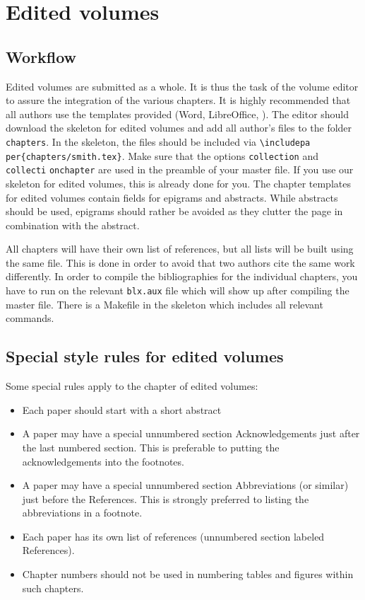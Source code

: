 \chapter{Edited volumes}
\section{Workflow}
Edited volumes are submitted as a whole. It is thus the task of the volume editor to assure the integration of the various chapters. It is highly recommended that all authors use the templates provided (Word, LibreOffice, \latex). The editor should download the skeleton for edited volumes and add all author's files to the folder \verb+chapters+. In the skeleton, the files should be included via \verb+\includepa+ \verb+per{chapters/smith.tex}+. Make sure that the options \verb+collection+ and \verb+collecti+ \verb+onchapter+ are used in the preamble of your master file. If you use our skeleton for edited volumes, this is already done for you. 
The chapter templates for edited volumes contain fields for epigrams and abstracts. While abstracts should be used, epigrams should rather be avoided as they clutter the page in combination with the abstract. 



All chapters will have their own list of references, but all lists will be built using the same {\bibtex} file. This is done in order to avoid that two authors cite the same work differently. In order to compile the bibliographies for the individual chapters, you have to run {\bibtex} on the relevant \verb+blx.aux+ file which will show up after compiling the master file. There is a Makefile in the skeleton which includes all relevant commands.
     
\section{Special style rules for edited volumes}
Some special rules apply to the chapter of edited volumes:
\begin{itemize}
\item Each paper should start with a short abstract
\item A paper may have a special unnumbered section Acknowledgements just after the last numbered section. This is preferable to putting the acknowledgements into the footnotes.
\item A paper may have a special unnumbered section Abbreviations (or similar) just before the References. This is strongly preferred to listing the abbreviations in a footnote.
\item Each paper has its own list of references (unnumbered section labeled References).
\item Chapter numbers should not be used in numbering tables and figures within such chapters.
\end{itemize}